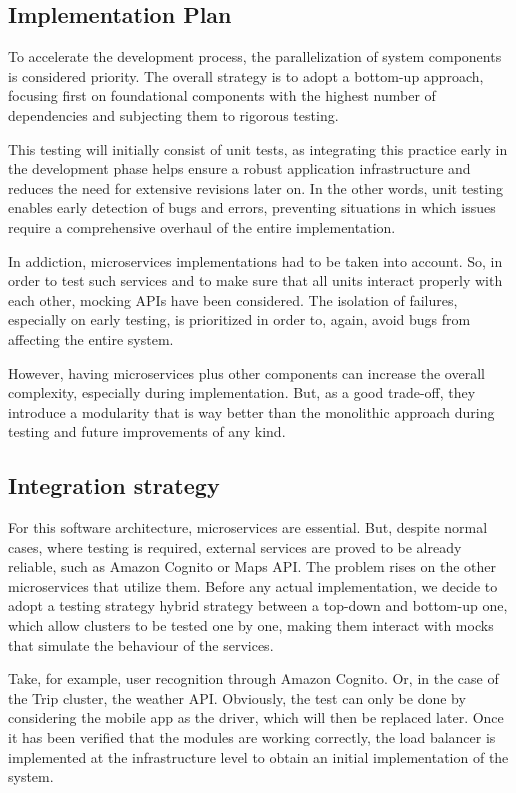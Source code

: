 \subsection{Implementation Plan}
To accelerate the development process, the parallelization of system components is considered priority. The overall strategy is to adopt a bottom-up approach, focusing first on foundational components with the highest number of dependencies and subjecting them to rigorous testing. 

This testing will initially consist of unit tests, as integrating this practice early in the development phase helps ensure a robust application infrastructure and reduces the need for extensive revisions later on. In the other words, unit testing enables early detection of bugs and errors, preventing situations in which issues require a comprehensive overhaul of the entire implementation. 

In addiction, microservices implementations had to be taken into account. So, in order to test such services and to make sure that all units interact properly with each other, mocking APIs\cite{mockingTesting} have been considered. The isolation of failures, especially on early testing, is prioritized in order to, again, avoid bugs from affecting the entire system. 

However, having microservices plus other components can increase the overall complexity, especially during implementation. But, as a good trade-off, they introduce a modularity that is way better than the monolithic approach during testing and future improvements of any kind. 

\subsection{Integration strategy}
For this software architecture, microservices are essential. But, despite normal cases, where testing is required, external services are proved to be already reliable, such as Amazon Cognito or Maps API. The problem rises on the other microservices that utilize them. Before any actual implementation, we decide to adopt a testing strategy hybrid strategy between a top-down and bottom-up one, which allow clusters to be tested one by one, making them interact with mocks that simulate the behaviour of the services. 

Take, for example, user recognition through Amazon Cognito. Or, in the case of the Trip cluster, the weather API. Obviously, the test can only be done by considering the mobile app as the driver, which will then be replaced later. Once it has been verified that the modules are working correctly, the load balancer is implemented at the infrastructure level to obtain an initial implementation of the system. 

